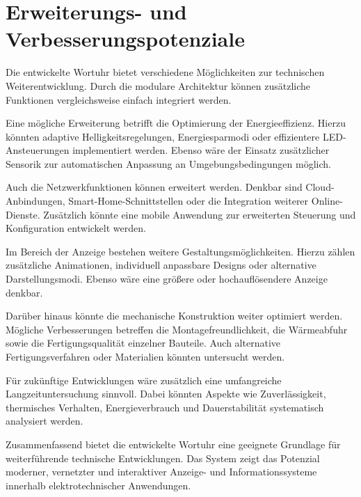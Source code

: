 \section{Erweiterungs- und Verbesserungspotenziale} 
Die entwickelte Wortuhr bietet verschiedene Möglichkeiten zur technischen Weiterentwicklung. 
Durch die modulare Architektur können zusätzliche Funktionen vergleichsweise einfach integriert werden.

Eine mögliche Erweiterung betrifft die Optimierung der Energieeffizienz. 
Hierzu könnten adaptive Helligkeitsregelungen, Energiesparmodi oder effizientere LED-Ansteuerungen implementiert werden. 
Ebenso wäre der Einsatz zusätzlicher Sensorik zur automatischen Anpassung an Umgebungsbedingungen möglich.

Auch die Netzwerkfunktionen können erweitert werden. 
Denkbar sind Cloud-Anbindungen, Smart-Home-Schnittstellen oder die Integration weiterer Online-Dienste. 
Zusätzlich könnte eine mobile Anwendung zur erweiterten Steuerung und Konfiguration entwickelt werden.

Im Bereich der Anzeige bestehen weitere Gestaltungsmöglichkeiten. 
Hierzu zählen zusätzliche Animationen, individuell anpassbare Designs oder alternative Darstellungsmodi. 
Ebenso wäre eine größere oder hochauflösendere Anzeige denkbar.

Darüber hinaus könnte die mechanische Konstruktion weiter optimiert werden. 
Mögliche Verbesserungen betreffen die Montagefreundlichkeit, die Wärmeabfuhr sowie die Fertigungsqualität einzelner Bauteile. 
Auch alternative Fertigungsverfahren oder Materialien könnten untersucht werden.

Für zukünftige Entwicklungen wäre zusätzlich eine umfangreiche Langzeituntersuchung sinnvoll. 
Dabei könnten Aspekte wie Zuverlässigkeit, thermisches Verhalten, Energieverbrauch und Dauerstabilität systematisch analysiert werden.

Zusammenfassend bietet die entwickelte Wortuhr eine geeignete Grundlage für weiterführende technische Entwicklungen. 
Das System zeigt das Potenzial moderner, vernetzter und interaktiver Anzeige- und Informationssysteme innerhalb elektrotechnischer Anwendungen.